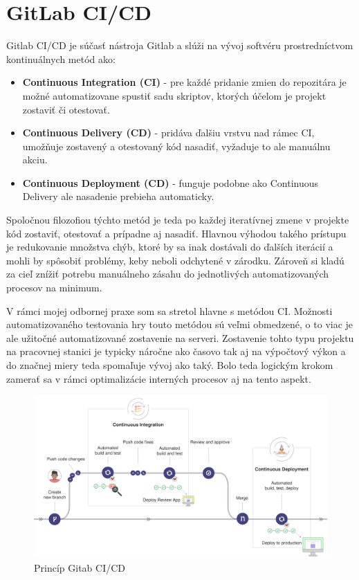 \documentclass[slovak,bachelorpractice]{diploma}
\begin{document}
\section{GitLab CI/CD}
\label{sec:GitLab}
Gitlab CI/CD \cite{Cicd} je súčasť nástroja Gitlab a slúži na vývoj softvéru prostredníctvom kontinuálnych metód ako:
\begin{itemize}
  \item \textbf{Continuous Integration (CI)} - pre každé pridanie zmien do repozitára je možné automatizovane spustiť sadu skriptov, ktorých účelom je projekt zostaviť či otestovať.
  \item \textbf{Continuous Delivery (CD)} - pridáva ďalšiu vrstvu nad rámec CI, umožňuje zostavený a otestovaný kód nasadiť, vyžaduje to ale manuálnu akciu.
  \item \textbf{Continuous Deployment (CD)} - funguje podobne ako Continuous Delivery ale nasadenie prebieha automaticky.
\end{itemize}
Spoločnou filozofiou týchto metód je teda po každej iteratívnej zmene v projekte kód zostaviť, otestovať a prípadne aj nasadiť. Hlavnou výhodou takého prístupu je redukovanie množstva chýb, ktoré by sa inak dostávali do ďalších iterácií a mohli by spôsobiť problémy, keby neboli odchytené v zárodku. Zároveň si kladú za cieľ znížiť potrebu manuálneho zásahu do jednotlivých automatizovaných procesov na minimum.

V rámci mojej odbornej praxe som sa stretol hlavne s metódou CI. Možnosti automatizovaného testovania hry touto metódou sú veľmi obmedzené, o to viac je ale užitočné automatizované zostavenie na serveri. Zostavenie tohto typu projektu na pracovnej stanici je typicky náročne ako časovo tak aj na výpočtový výkon a do značnej miery teda spomaľuje vývoj ako taký. Bolo teda logickým krokom zamerať sa v rámci optimalizácie interných procesov aj na tento aspekt.

\begin{figure}[!htbp]
	\centering
	\includegraphics[width=1\textwidth]{Pictures/gitlab.png}
	\caption{Princíp Gitab CI/CD \cite{Cicd}}
	\label{pic:Gitlab}
\end{figure}
\end{document}
